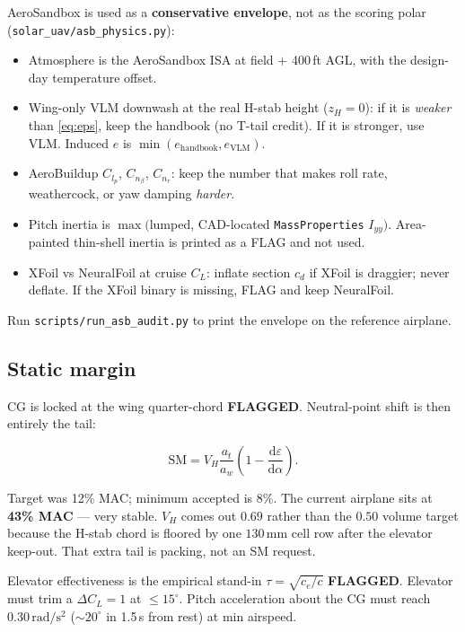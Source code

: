 \documentclass[11pt,letterpaper]{article}
\newcommand{\flag}{\textcolor{red!60!black}{\textbf{FLAGGED}}}
\newcommand{\code}[1]{\texttt{#1}}
\begin{document}
AeroSandbox is used as a \textbf{conservative envelope}, not as the scoring polar (\code{solar\_uav/asb\_physics.py}):

\begin{itemize}
  \item Atmosphere is the AeroSandbox ISA at field $+$ 400\,ft AGL, with the design-day temperature offset.
  \item Wing-only VLM downwash at the real H-stab height ($z_H=0$): if it is \emph{weaker} than \eqref{eq:eps}, keep the handbook (no T-tail credit). If it is stronger, use VLM. Induced $e$ is $\min(e_\mathrm{handbook}, e_\mathrm{VLM})$.
  \item AeroBuildup $C_{l_p}$, $C_{n_\beta}$, $C_{n_r}$: keep the number that makes roll rate, weathercock, or yaw damping \emph{harder}.
  \item Pitch inertia is $\max($lumped, CAD-located \code{MassProperties} $I_{yy})$. Area-painted thin-shell inertia is printed as a FLAG and not used.
  \item XFoil vs NeuralFoil at cruise $C_L$: inflate section $c_d$ if XFoil is draggier; never deflate. If the XFoil binary is missing, FLAG and keep NeuralFoil.
\end{itemize}

Run \code{scripts/run\_asb\_audit.py} to print the envelope on the reference airplane.

\subsection{Static margin}

CG is locked at the wing quarter-chord \flag{}. Neutral-point shift is then entirely the tail:

\begin{equation}
  \mathrm{SM}
    = V_H \frac{a_t}{a_w}
      \left(1 - \frac{\mathrm{d}\varepsilon}{\mathrm{d}\alpha}\right).
\end{equation}

Target was 12\% MAC; minimum accepted is 8\%. The current airplane sits at \textbf{43\% MAC} --- very stable. $V_H$ comes out $0.69$ rather than the $0.50$ volume target because the H-stab chord is floored by one $130\,\mathrm{mm}$ cell row after the elevator keep-out. That extra tail is packing, not an SM request.

Elevator effectiveness is the empirical stand-in $\tau = \sqrt{c_e/c}$ \flag{}. Elevator must trim a $\Delta C_L = 1$ at $\le 15^\circ$. Pitch acceleration about the CG must reach $0.30\,\mathrm{rad/s^2}$ ($\sim 20^\circ$ in 1.5\,s from rest) at min airspeed.
\end{document}
